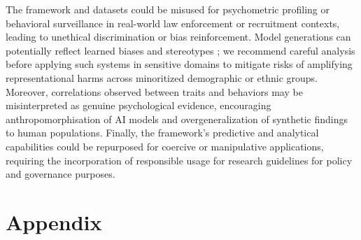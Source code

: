 \documentclass[11pt]{article}
\begin{document}
The framework and datasets could be misused for psychometric profiling or behavioral surveillance in real-world law enforcement or recruitment contexts, leading to unethical discrimination or bias reinforcement. Model generations can potentially reflect learned biases and stereotypes \cite{bai2025explicitly, gallegos2024bias}; we recommend careful analysis before applying such systems in sensitive domains to mitigate risks of amplifying representational harms across minoritized demographic or ethnic groups. Moreover, correlations observed between traits and behaviors may be misinterpreted as genuine psychological evidence, encouraging anthropomorphisation of AI models and overgeneralization of synthetic findings to human populations. Finally, the framework’s predictive and analytical capabilities could be repurposed for coercive or manipulative applications, requiring the incorporation of responsible usage for research guidelines for policy and governance purposes.

%


\newpage
\appendix
\onecolumn
\renewcommand{\thesection}{\Alph{section}}
\setcounter{section}{0}

\section*{\LARGE Appendix}

\vspace{1em}
\large
\renewcommand{\baselinestretch}{1.5}\selectfont
\makeatletter
\renewcommand{\l@section}{\@dottedtocline{1}{0em}{2.3em}}
\renewcommand{\l@subsection}{\@dottedtocline{2}{2.3em}{3.2em}}
\makeatother
\makeatother



\end{document}
